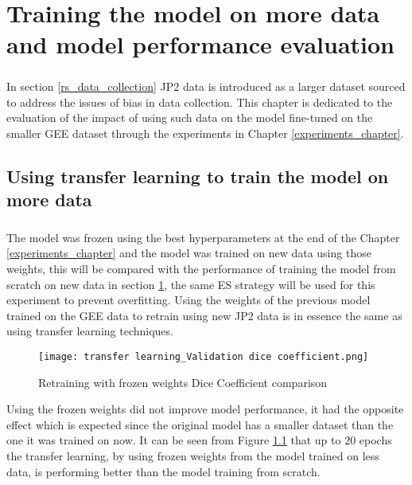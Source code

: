 \chapter{Training the model on more data and model performance evaluation} \label{new_data_train}
\paragraph{}
In section \ref{rs_data_collection} \gls{JP2} data is introduced as a larger dataset sourced to address the issues of bias in data collection. This chapter is dedicated to the evaluation of the impact of using such data on the model fine-tuned on the smaller \gls{GEE} dataset through the experiments in Chapter \ref{experiments_chapter}.

\section{Using transfer learning to train the model on more data}
\paragraph{}
The model was frozen using the best hyperparameters at the end of the Chapter \ref{experiments_chapter} and the model was trained on new data using those weights, this will be compared with the performance of training the model from scratch on new data in section \ref{new_data_train}, the same \gls{ES} strategy will be used for this experiment to prevent overfitting. Using the weights of the previous model trained on the \gls{GEE} data to retrain using new \gls{JP2} data is in essence the same as using transfer learning techniques.

\begin{figure}[hbt!]
    \centering
    \texttt{[image: transfer learning\_Validation dice coefficient.png]}
    \caption{Retraining with frozen weights Dice Coefficient comparison}
    \label{rt_dice}
\end{figure}

Using the frozen weights did not improve model performance, it had the opposite effect which is expected since the original model has a smaller dataset than the one it was trained on now. It can be seen from Figure \ref{rt_dice} that up to $20$ epochs the transfer learning, by using frozen weights from the model trained on less data, is performing better than the model training from scratch. 

